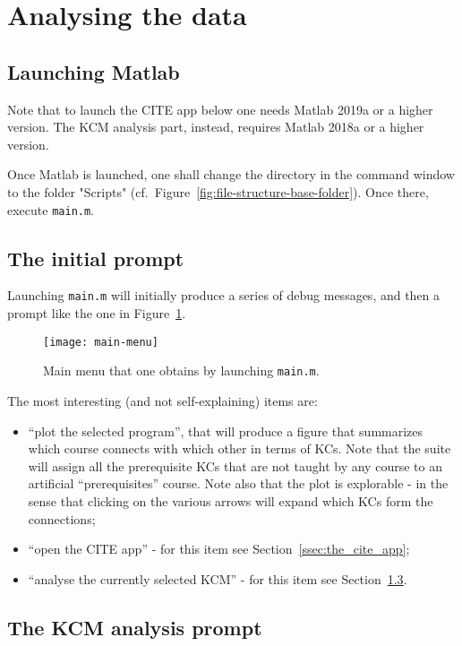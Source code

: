 \section{Analysing the data}
\label{sec:analysing_the_data}

\subsection{Launching Matlab}

Note that to launch the CITE app below one needs Matlab 2019a or a higher version. The KCM analysis part, instead, requires Matlab 2018a or a higher version.

Once Matlab is launched, one shall change the directory in the command window to the folder "Scripts" (cf.\ Figure~\ref{fig:file-structure-base-folder}). Once there, execute \texttt{main.m}.

\subsection{The initial prompt}

Launching \texttt{main.m} will initially produce a series of debug messages, and then a prompt like the one in Figure~\ref{fig:main-menu}.

\begin{figure}[!htbp]
	\centering
	\texttt{[image: main-menu]}
	\caption{Main menu that one obtains by launching \texttt{main.m}.}
	\label{fig:main-menu}
\end{figure}

The most interesting (and not self-explaining) items are:
%
\begin{itemize}
	\item ``plot the selected program'', that will produce a figure that summarizes which course connects with which other in terms of \acp{KC}. Note that the suite will assign all the prerequisite \acp{KC} that are not taught by any course to an artificial ``prerequisites'' course. Note also that the plot is explorable - in the sense that clicking on the various arrows will expand which \acp{KC} form the connections;
	\item ``open the CITE app'' - for this item see Section~\ref{ssec:the_cite_app};
	\item ``analyse the currently selected KCM'' - for this item see Section~\ref{ssec:the_kcm_analysis_prompt}.
\end{itemize}


\subsection{The KCM analysis prompt}
\label{ssec:the_kcm_analysis_prompt}

